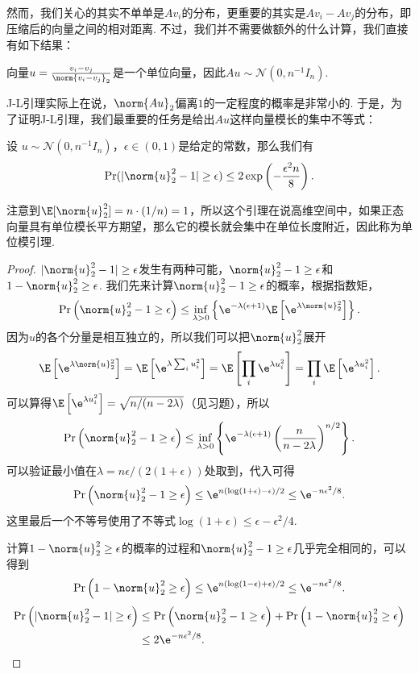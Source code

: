 然而，我们关心的其实不单单是$Av_i$的分布，更重要的其实是$Av_i-Av_j$的分布，即压缩后的向量之间的相对距离. 不过，我们并不需要做额外的什么计算，我们直接有如下结果：

\begin{lemma}\label{lemma:gaussian-vector-diff}
    向量$u=\frac{v_i-v_j}{\norm{v_i-v_j}_2}$是一个单位向量，因此$Au\sim \mathcal N(0,n^{-1}I_n)$.
\end{lemma}

J-L引理实际上在说，$\norm{Au}_2$偏离$1$的一定程度的概率是非常小的. 于是，为了证明J-L引理，我们最重要的任务是给出$Au$这样向量模长的集中不等式：
\begin{lemma}[单位模引理]\label{lemma:unit-mod-lemma}
    设 $u\sim \mathcal N(0,n^{-1}I_n)$，$\epsilon \in (0,1 )$是给定的常数，那么我们有
    \[
        \Pr(|\norm{u}_2^2 - 1| \geq \epsilon) \leq 2\exp \left(-\frac{\epsilon^2 n}{8}\right).
    \]
\end{lemma}
注意到$\E[\norm{u}_2^2]=n\cdot(1/n)=1$，所以这个引理在说高维空间中，如果正态向量具有单位模长平方期望，那么它的模长就会集中在单位长度附近，因此称为单位模引理.

\begin{proof}
$|\norm{u}_2^2 - 1| \geq \epsilon$发生有两种可能，$ \norm{u}_2^2 - 1 \geq \epsilon$和$ 1 - \norm{u}_2^2 \geq \epsilon$. 我们先来计算$ \norm{u}_2^2 - 1 \geq \epsilon$的概率，根据指数矩，
    \[
    \Pr\left(\norm{u}_2^2 - 1 \geq \epsilon\right) \leq \inf_{\lambda > 0} \left\{\e^{- \lambda (\epsilon + 1)} \E \left[\e^{\lambda \norm{u}_2^2}\right]\right\}. 
    \]
因为$u$的各个分量是相互独立的，所以我们可以把$\norm{u}_2^2$展开
    \[
    \E\left[\e^{\lambda \norm{u}_2^2}\right] = \E\left[\e^{\lambda \sum_i u_i^2}\right] = \E\left[\prod_i \e^{\lambda u_i^2}\right] = \prod_i \E\left[\e^{\lambda u_i^2}\right]. 
    \]
可以算得$\E\left[\e^{\lambda u_i^2}\right]= \sqrt{n/(n-2\lambda)}$（见习题），所以
    \[
    \Pr\left(\norm{u}_2^2 - 1 \geq \epsilon\right) \leq \inf_{\lambda > 0} \left\{\e^{- \lambda (\epsilon + 1)} \left(\frac{n}{n-2\lambda} \right)^{n/2}\right\}. 
    \]
可以验证最小值在$\lambda = n\epsilon/(2(1+\epsilon))$处取到，代入可得
    \[
    \Pr\left(\norm{u}_2^2 - 1 \geq \epsilon\right) \leq \e^{n(\log (1+\epsilon) - \epsilon)/2} \leq \e^{-n\epsilon^2/8}. 
    \]
这里最后一个不等号使用了不等式$\log(1+\epsilon)\leq\epsilon-\epsilon^2/4$. 

计算$1 - \norm{u}_2^2 \geq \epsilon$的概率的过程和$\norm{u}_2^2 - 1 \geq \epsilon$几乎完全相同的，可以得到
    \[
    \Pr\left(1 - \norm{u}_2^2 \geq \epsilon\right) \leq \e^{n(\log (1-\epsilon) + \epsilon)/2} \leq \e^{-n\epsilon^2/8}. 
    \]
    \begin{align*}
        \Pr\left(| \norm{u}_2^2 - 1| \geq \epsilon\right) &\leq \Pr\left(\norm{u}_2^2 - 1 \geq \epsilon\right) + \Pr\left(1 - \norm{u}_2^2 \geq \epsilon\right) \\
        &\leq 2\e^{-n\epsilon^2/8}. 
    \end{align*}
\end{proof}

